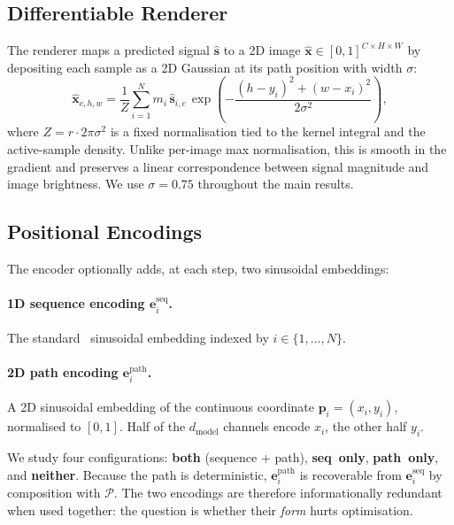 \documentclass[conference]{IEEEtran}
\begin{document}
\subsection{Differentiable Renderer}\label{ssec:renderer}

The renderer maps a predicted signal $\hat{\mathbf{s}}$ to a 2D image
$\hat{\mathbf{x}}\in[0,1]^{C\times H\times W}$ by depositing each
sample as a 2D Gaussian at its path position with width $\sigma$:
\begin{equation}
  \hat{\mathbf{x}}_{c,h,w} = \frac{1}{Z}\sum_{i=1}^N m_i \, \hat{\mathbf{s}}_{i,c} \,
    \exp\!\left(-\frac{(h-y_i)^2 + (w-x_i)^2}{2\sigma^2}\right),
\end{equation}
where $Z = r \cdot 2\pi\sigma^2$ is a fixed normalisation tied to
the kernel integral and the active-sample density. Unlike
per-image max normalisation, this is smooth in the gradient and
preserves a linear correspondence between signal magnitude and
image brightness. We use $\sigma=0.75$ throughout the main
results.

\subsection{Positional Encodings}\label{ssec:pe}

The encoder optionally adds, at each step, two sinusoidal
embeddings:

\paragraph{1D sequence encoding $\mathbf{e}^{\text{seq}}_i$.}
The standard~\cite{vaswani2017attention} sinusoidal embedding
indexed by $i\in\{1,\ldots,N\}$.

\paragraph{2D path encoding $\mathbf{e}^{\text{path}}_i$.}
A 2D sinusoidal embedding of the continuous coordinate
$\mathbf{p}_i=(x_i,y_i)$, normalised to $[0,1]$. Half of the
$d_{\text{model}}$ channels encode $x_i$, the other half $y_i$.

We study four configurations: \textbf{both} (sequence + path),
\textbf{seq~only}, \textbf{path~only}, and \textbf{neither}.
Because the path is deterministic, $\mathbf{e}^{\text{path}}_i$
is recoverable from $\mathbf{e}^{\text{seq}}_i$ by composition with
$\mathcal{P}$. The two encodings are therefore informationally
redundant when used together: the question is whether their
\emph{form} hurts optimisation.
\end{document}
